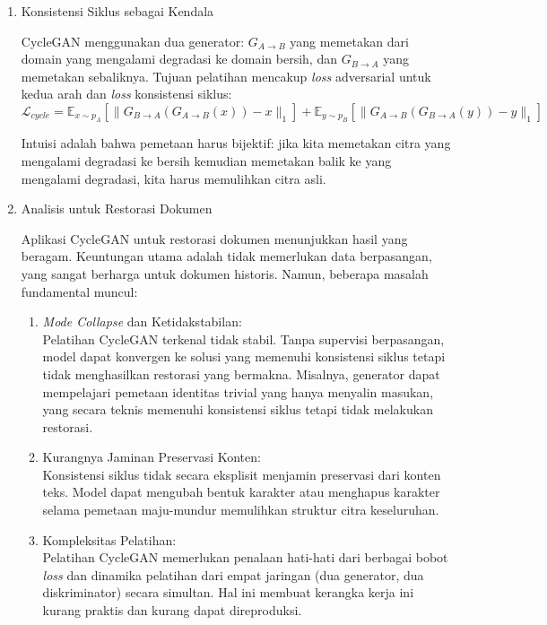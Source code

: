 \begin{enumerate}[leftmargin=*, labelindent=0pt, itemsep=1ex, topsep=0pt]

\item Konsistensi Siklus sebagai Kendala
\label{para:cyclegan-consistency}

CycleGAN menggunakan dua generator: $G_{A \to B}$ yang memetakan dari domain yang mengalami degradasi ke domain bersih, dan $G_{B \to A}$ yang memetakan sebaliknya. Tujuan pelatihan mencakup \textit{loss} adversarial untuk kedua arah dan \textit{loss} konsistensi siklus:
\begin{equation}
      \mathcal{L}_{cycle} = \mathbb{E}_{x \sim p_A}[\|G_{B \to A}(G_{A \to B}(x)) - x\|_1] + \mathbb{E}_{y \sim p_B}[\|G_{A \to B}(G_{B \to A}(y)) - y\|_1]
\end{equation}

Intuisi adalah bahwa pemetaan harus bijektif: jika kita memetakan citra yang mengalami degradasi ke bersih kemudian memetakan balik ke yang mengalami degradasi, kita harus memulihkan citra asli.

\item Analisis untuk Restorasi Dokumen
\label{para:cyclegan-analisis}

Aplikasi CycleGAN untuk restorasi dokumen menunjukkan hasil yang beragam. Keuntungan utama adalah tidak memerlukan data berpasangan, yang sangat berharga untuk dokumen historis. Namun, beberapa masalah fundamental muncul:

\begin{enumerate}[leftmargin=1.5em, labelsep=0.5em, itemindent=0pt, label=\alph*., topsep=0pt, parsep=0pt, itemsep=0pt]
      \item \textit{Mode Collapse} dan Ketidakstabilan: \mbox{}\\[0.1em] Pelatihan CycleGAN terkenal tidak stabil. Tanpa supervisi berpasangan, model dapat konvergen ke solusi yang memenuhi konsistensi siklus tetapi tidak menghasilkan restorasi yang bermakna. Misalnya, generator dapat mempelajari pemetaan identitas trivial yang hanya menyalin masukan, yang secara teknis memenuhi konsistensi siklus tetapi tidak melakukan restorasi.
      \item Kurangnya Jaminan Preservasi Konten: \mbox{}\\[0.1em] Konsistensi siklus tidak secara eksplisit menjamin preservasi dari konten teks. Model dapat mengubah bentuk karakter atau menghapus karakter selama pemetaan maju-mundur memulihkan struktur citra keseluruhan.
      \item Kompleksitas Pelatihan: \mbox{}\\[0.1em] Pelatihan CycleGAN memerlukan penalaan hati-hati dari berbagai bobot \textit{loss} dan dinamika pelatihan dari empat jaringan (dua generator, dua diskriminator) secara simultan. Hal ini membuat kerangka kerja ini kurang praktis dan kurang dapat direproduksi.
\end{enumerate}


\end{enumerate}
